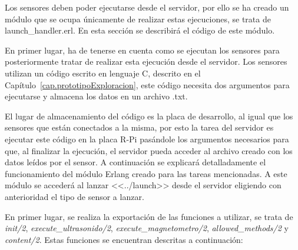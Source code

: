 Los sensores deben poder ejecutarse desde el servidor, por ello se ha creado un módulo que se ocupa únicamente de realizar estas ejecuciones, se trata de launch\_handler.erl. En esta sección se describirá el código de este módulo.

En primer lugar, ha de tenerse en cuenta como se ejecutan los sensores para posteriormente tratar de realizar esta ejecución desde el servidor. Los sensores utilizan un código escrito en lenguaje C, descrito en el Capítulo~\ref{cap.prototipoExploracion}, este código necesita dos argumentos para ejecutarse y almacena los datos en un archivo .txt. 

El lugar de almacenamiento del código es la placa de desarrollo, al igual que los sensores que están conectados a la misma, por esto la tarea del servidor es ejecutar este código en la placa R-Pi pasándole los argumentos necesarios para que, al finalizar la ejecución, el servidor pueda acceder al archivo creado con los datos leídos por el sensor. A continuación se explicará detalladamente el funcionamiento del módulo Erlang creado para las tareas mencionadas. A este módulo se accederá al lanzar <<../launch>> desde el servidor eligiendo con anterioridad el tipo de sensor a lanzar.

En primer lugar, se realiza la exportación de las funciones a utilizar, se trata de  \textit{init/2}, \textit{execute\_ultrasonido/2}, \textit{execute\_magnetometro/2}, \textit{allowed\_methods/2} y \textit{content/2}. Estas funciones se encuentran descritas a continuación:


